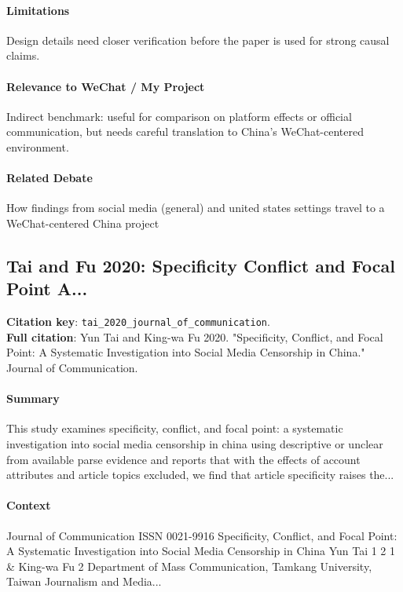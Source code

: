 \documentclass[12pt]{article}
\begin{document}
\paragraph{Limitations} Design details need closer verification before the paper is used for strong causal claims.

\paragraph{Relevance to WeChat / My Project} Indirect benchmark: useful for comparison on platform effects or official communication, but needs careful translation to China's WeChat-centered environment.

\paragraph{Related Debate} How findings from social media (general) and united states settings travel to a WeChat-centered China project


\subsection{Tai and Fu 2020: Specificity Conflict and Focal Point A...}
\textbf{Citation key}: \texttt{tai\_2020\_journal\_of\_communication}.\\
\textbf{Full citation}: Yun Tai and King-wa Fu 2020. "Specificity, Conflict, and Focal Point: A Systematic Investigation into Social Media Censorship in China." Journal of Communication.

\paragraph{Summary} This study examines specificity, conflict, and focal point: a systematic investigation into social media censorship in china using descriptive or unclear from available parse evidence and reports that with the effects of account attributes and article topics excluded, we find that article specificity raises the...

\paragraph{Context} Journal of Communication ISSN 0021-9916 Specificity, Conflict, and Focal Point: A Systematic Investigation into Social Media Censorship in China Yun Tai 1 2 1 \& King-wa Fu 2 Department of Mass Communication, Tamkang University, Taiwan Journalism and Media...
\end{document}
